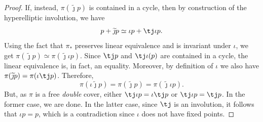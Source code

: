 \begin{proof}
        
        If, instead, $\pi(\widetilde{\jmath}p)$ is contained in a cycle, then by construction of the hyperelliptic involution, we have
        \begin{equation}\label{c}
             p+\widetilde{\jmath}p\simeq \iota p+\tj\iota p.
        \end{equation}  
        Using the fact that $\pi_*$ preserves linear equivalence and is invariant under $\iota$, we get
        $\pi(\widetilde{\jmath}p)\simeq \pi(\widetilde{\jmath}\iota p).
        $
        Since $\tj p$ and $\tj\iota(p)$
        are contained in a cycle, the linear equivalence is, in fact, an equality. Moreover, by definition of $\iota$ we also have 
        $\pi(\widetilde{\jmath}p)=\pi(\iota \tj p)$. Therefore,
        \[
\pi(\iota\widetilde{\jmath}p)=\pi(\widetilde{\jmath}p)=\pi(\widetilde{\jmath}\iota p).
        \]
But, as $\pi$ is a free \emph{double} cover,  either $\tj\iota p=\iota \tj p$ or $\tj\iota p=\tj p$. In the former case, we are done. In the latter case, since $\tj$ is an involution, it follows that $\iota p = p$, which is a contradiction since $\iota$ does not have fixed points. 
    \end{proof}


